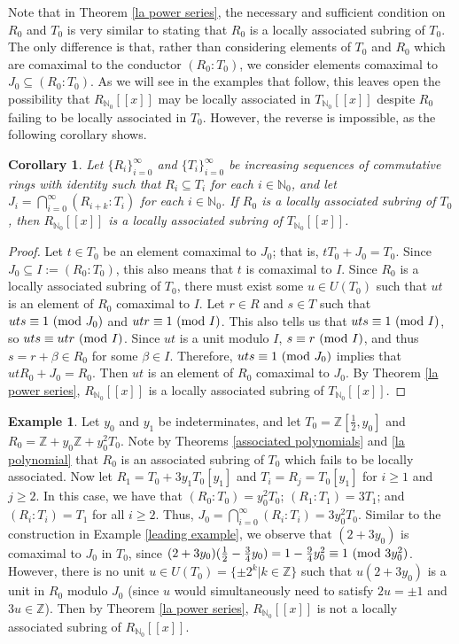\documentclass[12pt]{amsart}
\newtheorem{corollary}[theorem]{Corollary}
\theoremstyle{definition}
\newtheorem{example}[theorem]{Example}
\newcommand{\bZ}{\mathbb Z}
\newcommand{\bNo}{{{\mathbb N}_0}}
\newcommand{\modulo}[1]{\textup{ (mod }#1)}
\begin{document}
Note that in Theorem \ref{la power series}, the necessary and sufficient condition on $R_0$ and $T_0$ is very similar to stating that $R_0$ is a locally associated subring of $T_0$. The only difference is that, rather than considering elements of $T_0$ and $R_0$ which are comaximal to the conductor $(R_0:T_0)$, we consider elements comaximal to $J_0\subseteq (R_0:T_0)$. As we will see in the examples that follow, this leaves open the possibility that $R_\bNo[[x]]$ may be locally associated in $T_\bNo[[x]]$ despite $R_0$ failing to be locally associated in $T_0$. However, the reverse is impossible, as the following corollary shows.

\begin{corollary}
    \label{la constants implies la ps}
    Let $\{R_i\}_{i=0}^\infty$ and $\{T_i\}_{i=0}^\infty$ be increasing sequences of commutative rings with identity such that $R_i\subseteq T_i$ for each $i\in\bNo$, and let $J_i=\bigcap_{i=0}^\infty(R_{i+k}:T_i)$ for each $i\in\bNo$. If $R_0$ is a locally associated subring of $T_0$, then $R_\bNo[[x]]$ is a locally associated subring of $T_\bNo[[x]]$.
\end{corollary}

\begin{proof}
    Let $t\in T_0$ be an element comaximal to $J_0$; that is, $tT_0+J_0=T_0$. Since $J_0\subseteq I:=(R_0:T_0)$, this also means that $t$ is comaximal to $I$. Since $R_0$ is a locally associated subring of $T_0$, there must exist some $u\in U(T_0)$ such that $ut$ is an element of $R_0$ comaximal to $I$. Let $r\in R$ and $s\in T$ such that $uts\equiv 1\modulo{J_0}$ and $utr\equiv 1\modulo{I}$. This also tells us that $uts\equiv 1\modulo{I}$, so $uts\equiv utr\modulo{I}$. Since $ut$ is a unit modulo $I$, $s\equiv r\modulo{I}$, and thus $s=r+\beta\in R_0$ for some $\beta\in I$. Therefore, $uts\equiv 1\modulo{J_0}$ implies that $utR_0+J_0=R_0$. Then $ut$ is an element of $R_0$ comaximal to $J_0$. By Theorem \ref{la power series}, $R_\bNo[[x]]$ is a locally associated subring of $T_\bNo[[x]]$.
\end{proof}

\begin{example}
    \label{ps not la}
    Let $y_0$ and $y_1$ be indeterminates, and let $T_0=\bZ[\frac{1}{2},y_0]$ and $R_0=\bZ+y_0\bZ+y_0^2T_0$. Note by Theorems \ref{associated polynomials} and \ref{la polynomial} that $R_0$ is an associated subring of $T_0$ which fails to be locally associated. Now let $R_1=T_0+3y_1T_0[y_1]$ and  $T_i=R_j=T_0[y_1]$ for $i\geq 1$ and $j\geq 2$. In this case, we have that $(R_0:T_0)=y_0^2T_0$; $(R_1:T_1)=3T_1$; and $(R_i:T_i)=T_1$ for all $i\geq 2$. Thus, $J_0=\bigcap_{i=0}^\infty (R_i:T_i)=3y_0^2T_0$. Similar to the construction in Example \ref{leading example}, we observe that $(2+3y_0)$ is comaximal to $J_0$ in $T_0$, since $(2+3y_0)(\frac{1}{2}-\frac{3}{4}y_0)=1-\frac{9}{4}y_0^2\equiv 1\modulo{3y_0^2}$. However, there is no unit $u\in U(T_0)=\{\pm 2^k|k\in\bZ\}$ such that $u(2+3y_0)$ is a unit in $R_0$ modulo $J_0$ (since $u$ would simultaneously need to satisfy $2u=\pm 1$ and $3u\in \bZ$). Then by Theorem \ref{la power series}, $R_\bNo[[x]]$ is not a locally associated subring of $R_\bNo[[x]]$. 
\end{example}
\end{document}
